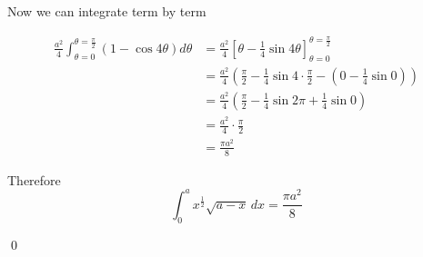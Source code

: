 \begin{solution}
    Now we can integrate term by term

    \begin{align*}
        \frac{a^2}{4} \int_{\theta=0}^{\theta=\frac{\pi}{2}} \left(1 - \cos 4\theta\right) d\theta
        &= \frac{a^2}{4} \left[ \theta - \frac{1}{4}\sin 4\theta \right]_{\theta=0}^{\theta=\frac{\pi}{2}} \tag{integrating $1$ and $\cos 4\theta$} \\
        &= \frac{a^2}{4} \left( \frac{\pi}{2} - \frac{1}{4}\sin 4\cdot\frac{\pi}{2} - \left(0 - \frac{1}{4}\sin 0\right) \right) \tag{substituting the bounds} \\
        &= \frac{a^2}{4} \left( \frac{\pi}{2} - \frac{1}{4}\sin 2\pi + \frac{1}{4}\sin 0 \right) \\
        &= \frac{a^2}{4} \cdot \frac{\pi}{2} \tag{since $\sin 2\pi = 0$ and $\sin 0 = 0$} \\
        &= \frac{\pi a^2}{8}
    \end{align*}

    Therefore
    \[
        \int_0^{a} x^{\frac{1}{2}} \sqrt{a - x} \, dx = \frac{\pi a^2}{8}
    \]

    \qed
\end{solution}

